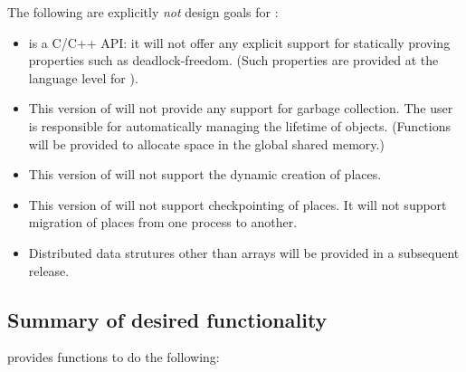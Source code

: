 The following are explicitly {\em not} design goals for \Xtenlib:
\begin{itemize}
{}\item \Xtenlib{} is a C/C++ API: it will not offer any explicit
support for statically proving properties such as deadlock-freedom.
(Such properties are provided at the language level for \Xten).
{}\item This version of \Xtenlib{} will not provide any support for
garbage collection. The user is responsible for automatically managing
the lifetime of objects. (Functions will be provided to allocate space
in the global shared memory.) 

{}\item This version of \Xtenlib{} will not support the dynamic creation of places.

{}\item This version of \Xtenlib{} will not support checkpointing of
places. It will not support migration of places from one process to
another.

{}\item Distributed data strutures other than arrays will be provided in a subsequent release.

\end{itemize}

\subsection{Summary of desired functionality}
\Xtenlib{} provides functions to do the following:

